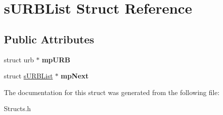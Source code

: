 \hypertarget{structsURBList}{\section{s\-U\-R\-B\-List \-Struct \-Reference}
\label{structsURBList}
}
\subsection*{\-Public \-Attributes}
\begin{DoxyCompactItemize}
\item 
\hypertarget{structsURBList_ae0ae6c619f9e19eebb26b19f12356723}{struct urb $\ast$ {\bfseries mp\-U\-R\-B}}\label{structsURBList_ae0ae6c619f9e19eebb26b19f12356723}

\item 
\hypertarget{structsURBList_a5cd843dd8c9950b9c2348cffea3dea95}{struct \hyperlink{structsURBList}{s\-U\-R\-B\-List} $\ast$ {\bfseries mp\-Next}}\label{structsURBList_a5cd843dd8c9950b9c2348cffea3dea95}

\end{DoxyCompactItemize}


\-The documentation for this struct was generated from the following file\-:\begin{DoxyCompactItemize}
\item 
\-Structs.\-h\end{DoxyCompactItemize}
